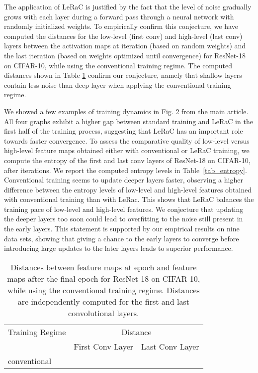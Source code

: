 \documentclass[10pt,twocolumn,letterpaper]{article}
\begin{document}
The application of LeRaC is justified by the fact that the level of noise gradually grows with each layer during a forward pass through a neural network with randomly initialized weights. To empirically confirm this conjecture, we have computed the distances for the low-level (first conv) and high-level (last conv) layers between the activation maps at iteration  (based on random weights) and the last iteration (based on weights optimized until convergence) for ResNet-18 on CIFAR-10, while using the conventional training regime. The computed distances shown in Table \ref{tab_noise_quant} confirm our conjecture, namely that shallow layers contain less noise than deep layer when applying the conventional training regime.

We showed a few examples of training dynamics in Fig. 2 from the main article. All four graphs exhibit a higher gap between standard training and LeRaC in the first half of the training process, suggesting that LeRaC has an important role towards faster convergence. To assess the comparative quality of low-level versus high-level feature maps obtained either with conventional or LeRaC training, we compute the entropy of the first and last conv layers of ResNet-18 on CIFAR-10, after  iterations. We report the computed entropy levels in Table~\ref{tab_entropy}. Conventional training seems to update deeper layers faster, observing a higher difference between the entropy levels of low-level and high-level features obtained with conventional training than with LeRac. This shows that LeRaC balances the training pace of low-level and high-level features. We conjecture that updating the deeper layers too soon could lead to overfitting to the noise still present in the early layers. This statement is supported by our empirical results on nine data sets, showing that giving a chance to the early layers to converge before introducing large updates to the later layers leads to superior performance. 

\begin{table}[t]
  \small{
\begin{center}
  \begin{tabular}{lcc}
    \toprule
    Training Regime     & \multicolumn{2}{c}{Distance} \\
    & First Conv Layer & Last Conv Layer \\
    \midrule
     conventional             &  & \\
    \bottomrule
  \end{tabular}
    \end{center}
    }
      \vspace{-0.6cm}
    \caption{Distances between feature maps at epoch  and feature maps after the final epoch for ResNet-18 on CIFAR-10, while using the conventional training regime. Distances are independently computed for the first and last convolutional layers.}
  \label{tab_noise_quant}
\end{table}
\end{document}
